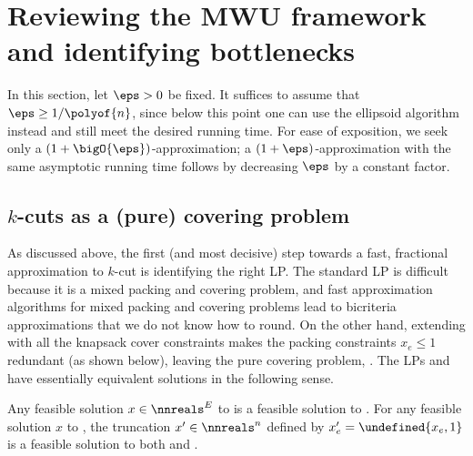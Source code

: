 \documentclass{toc}
\let\minof\undefined\usepackage{math} %
\begin{document}
\section{Reviewing the MWU framework and identifying bottlenecks}


In this section, let $\eps > 0$ be fixed. It suffices to assume that
$\eps \geq 1 / \polyof{n}$, since below this point one can use the
ellipsoid algorithm instead and still meet the desired running
time. For ease of exposition, we seek only a
%
$(1 + \bigO{\eps})$-approximation; a %
$(1 + \eps)$-approximation with the same
asymptotic running time follows by decreasing $\eps$ by a constant
factor.

\subsection{$k$-cuts as a (pure) covering problem}
As discussed above, the first (and most decisive) step towards a fast,
fractional approximation to $k$-cut is identifying the right LP. The
standard LP  is difficult because it is a mixed
packing and covering problem, and fast approximation algorithms for
mixed packing and covering problems lead to bicriteria approximations
that we do not know how to round. On the other hand, extending
 with all the knapsack cover constraints makes the
packing constraints $x_e \leq 1$ redundant (as shown below), leaving
the pure covering problem, . The LPs 
and  have essentially equivalent solutions in the
following sense.
\begin{lemma}
   Any feasible solution $x \in \nnreals^E$ to
   is a feasible solution to . For any
  feasible solution $x$ to , the truncation
  $x' \in \nnreals^n$ defined by $x_e' = \minof{x_e,1}$ is a feasible
  solution to both  and .
\end{lemma}
\end{document}
